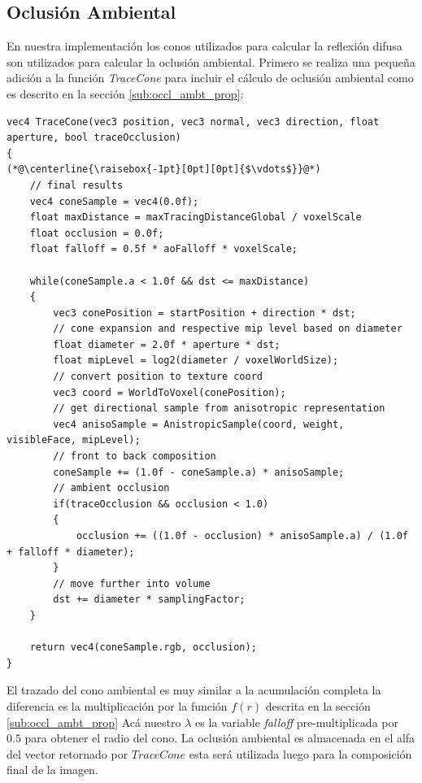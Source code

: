 \subsection{Oclusión Ambiental} %
\label{sub:oclusion_ambient}
En nuestra implementación los conos utilizados para calcular la reflexión difusa son utilizados para calcular la oclusión ambiental. Primero se realiza una pequeña adición a la función \emph{TraceCone} para incluir el cálculo de oclusión ambiental como es descrito en la sección \ref{sub:occl_ambt_prop}:
\\
\begin{lstlisting}[caption={Oclusión ambiental para el algoritmo de trazado de conos.}, label=Trace5]
vec4 TraceCone(vec3 position, vec3 normal, vec3 direction, float aperture, bool traceOcclusion)
{
(*@\centerline{\raisebox{-1pt}[0pt][0pt]{$\vdots$}}@*)
    // final results
    vec4 coneSample = vec4(0.0f);
    float maxDistance = maxTracingDistanceGlobal / voxelScale
    float occlusion = 0.0f;
    float falloff = 0.5f * aoFalloff * voxelScale;

    while(coneSample.a < 1.0f && dst <= maxDistance)
    {
        vec3 conePosition = startPosition + direction * dst;
        // cone expansion and respective mip level based on diameter
        float diameter = 2.0f * aperture * dst;
        float mipLevel = log2(diameter / voxelWorldSize);
        // convert position to texture coord
        vec3 coord = WorldToVoxel(conePosition);
        // get directional sample from anisotropic representation
        vec4 anisoSample = AnistropicSample(coord, weight, visibleFace, mipLevel);
        // front to back composition
        coneSample += (1.0f - coneSample.a) * anisoSample;
        // ambient occlusion
        if(traceOcclusion && occlusion < 1.0)
        {
            occlusion += ((1.0f - occlusion) * anisoSample.a) / (1.0f + falloff * diameter);
        }
        // move further into volume
        dst += diameter * samplingFactor;
    }

    return vec4(coneSample.rgb, occlusion);
}
\end{lstlisting}
El trazado del cono ambiental es muy similar a la acumulación completa la diferencia es la multiplicación por la función $f(r)$ descrita en la sección \ref{sub:occl_ambt_prop} Acá nuestro $\lambda$ es la variable \emph{falloff} pre-multiplicada por $0.5$ para obtener el radio del cono. La oclusión ambiental es almacenada en el alfa del vector retornado por $TraceCone$ esta será utilizada luego para la composición final de la imagen.


